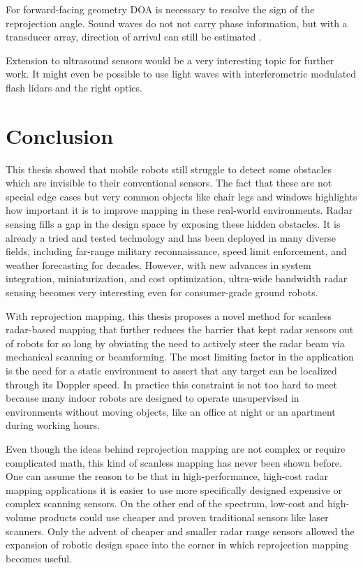 For forward-facing geometry DOA is necessary to resolve the sign of the
reprojection angle. Sound waves do not not carry phase information, but
with a transducer array, direction of arrival can still be estimated
\cite{Kunin2010}.

Extension to ultrasound sensors would be a very interesting topic for
further work. It might even be possible to use light waves with interferometric
modulated flash lidars and the right optics.

\section{Conclusion}\label{conclusion-1}

This thesis showed that mobile robots still struggle to detect some obstacles which are invisible to their conventional sensors. The fact that these are not special edge cases but very common objects like chair legs and windows highlights how important it is to improve mapping in these real-world environments. Radar sensing fills a gap in the design space by exposing these hidden obstacles. It is already a tried and tested technology and has been deployed in many diverse fields, including far-range military reconnaissance, speed limit enforcement, and weather forecasting for decades. However, with new advances in system integration, miniaturization, and cost optimization, ultra-wide bandwidth radar sensing becomes very interesting even for consumer-grade ground robots.

With reprojection mapping, this thesis proposes a novel method for scanless radar-based mapping that further reduces the barrier that kept radar sensors out of robots for so long by obviating the need to actively steer the radar beam via mechanical scanning or beamforming. The most limiting factor in the application is the need for a static environment to assert that any target can be localized through its Doppler speed. In practice this constraint is not too hard to meet because many indoor robots are designed to operate unsupervised in environments without moving objects, like an office at night or an apartment during working hours.

Even though the ideas behind reprojection mapping are not complex or require complicated math, this kind of scanless mapping has never been shown before. One can assume the reason to be that in high-performance, high-cost radar mapping applications it is easier to use more specifically designed expensive or complex scanning sensors. On the other end of the spectrum, low-cost and high-volume products could use cheaper and proven traditional sensors like laser scanners. Only the advent of cheaper and smaller radar range sensors allowed the expansion of robotic design space into the corner in which reprojection mapping becomes useful.

